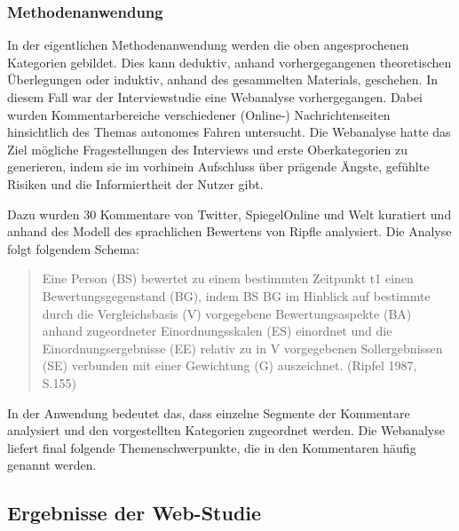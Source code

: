 \documentclass[12pt]{article}
\begin{document}
\subsubsection*{Methodenanwendung}
In der eigentlichen Methodenanwendung werden die oben angesprochenen Kategorien gebildet. Dies kann deduktiv, anhand vorhergegangenen theoretischen Überlegungen oder induktiv, anhand des gesammelten Materials, geschehen.
In diesem Fall war der Interviewstudie eine Webanalyse vorhergegangen. Dabei wurden Kommentarbereiche verschiedener (Online-) Nachrichtenseiten hinsichtlich des Themas autonomes Fahren untersucht. Die Webanalyse hatte das Ziel mögliche Fragestellungen des Interviews und erste Oberkategorien zu generieren, indem sie im vorhinein Aufschluss über prägende Ängste, gefühlte Risiken und die Informiertheit der Nutzer gibt.

Dazu wurden 30 Kommentare von Twitter, SpiegelOnline und Welt kuratiert und anhand des Modell des sprachlichen Bewertens von Ripfle analysiert. Die Analyse folgt folgendem Schema:

\begin{quote}
  Eine Person (BS) bewertet zu einem bestimmten Zeitpunkt t1 einen Bewertungsgegenstand (BG), indem BS BG im Hinblick auf bestimmte durch die Vergleichsbasis (V) vorgegebene Bewertungsaspekte (BA) anhand zugeordneter Einordnungsskalen (ES) einordnet und die Einordnungsergebnisse (EE) relativ zu in V vorgegebenen Sollergebnissen (SE) verbunden mit einer Gewichtung (G) auszeichnet. (Ripfel 1987, S.155)
\end{quote}

In der Anwendung bedeutet das, dass einzelne Segmente der Kommentare analysiert und den vorgestellten Kategorien zugeordnet werden. Die Webanalyse liefert final folgende Themenschwerpunkte, die in den Kommentaren häufig genannt werden.

\subsection{Ergebnisse der Web-Studie}
\end{document}
